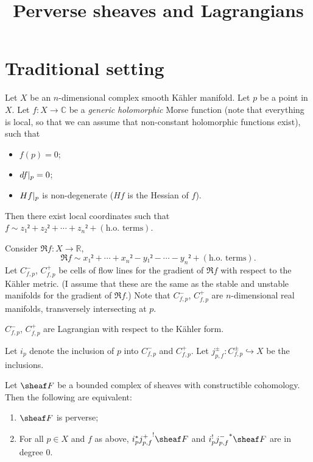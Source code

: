 \documentclass[english]{short-notes}
\title{Perverse sheaves and Lagrangians}
\newcommand\me{\normalcolor}
\newcommand\david{\color{black!60!green}}
\let\David\david
\begin{document}
\maketitle

\section{Traditional setting}

\david
Let $X$ be an $n$-dimensional complex smooth Kähler manifold.
Let $p$ be a point in $X$.
Let $f\colon X → ℂ$ be a \emph{generic} \emph{holomorphic} Morse function (note that everything is local, so that we can assume that non-constant holomorphic functions exist), such that
\begin{itemize}
    \item $f(p) = 0$;
    \item $\res{df}p = 0$;
    \item $\res{Hf}p $ is non-degenerate \me($Hf$ is the Hessian of $f$)\david.
\end{itemize}
Then there exist local coordinates such that $f \sim z₁² + z₂² + \dotsb + z_n² + (\text{h.o.\ terms})$.

Consider $\Re f\colon X → ℝ$,
\[
\Re f \sim x₁² + \dotsb + x_n² - y₁² - \dotsb -y_n² + (\text{h.o.\ terms}).
\]
Let $C_{f,p}^-$, $C_{f,p}^+$ be cells of flow lines for the gradient of $\Re f$ with respect to the Kähler metric.
\me(I assume that these are the same as the stable and unstable manifolds for the gradient of $\Re f$.)
\David
Note that $C_{f,p}^-$, $C_{f,p}^+$ are $n$-dimensional real manifolds, transversely intersecting at $p$.

\begin{Prop}
    $C_{f,p}^-$, $C_{f,p}^+$ are Lagrangian with respect to the Kähler form.
\end{Prop}

Let $i_p$ denote the inclusion of $p$ into $C_{f,p}^-$ and $C_{f,p}^+$.
Let $j_{p,f}^\pm\colon C_{f,p}^\pm \hookrightarrow X$ be the inclusions.

\begin{Thm}
    Let $\sheaf F$ be a bounded complex of sheaves with constructible cohomology.
    Then the following are equivalent:
    \begin{enumerate}
        \item $\sheaf F$ is perverse;
        \item For all $p ∈ X$ and $f$ as above, $i_p^* {j_{p,f}^+}^! \sheaf F$ and $i_p^!{j_{p,f}^-}^* \sheaf F$ are in degree $0$.
    \end{enumerate}
\end{Thm}
\end{document}
